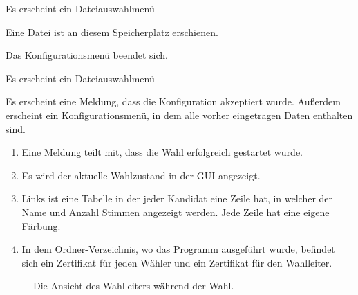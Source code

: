 \documentclass[parskip=full]{scrartcl}
\begin{document}
		{Es erscheint ein Dateiauswahlmenü}

		{Eine Datei ist an diesem Speicherplatz erschienen.}

		{Das Konfigurationsmenü beendet sich.}

		{Es erscheint ein Dateiauswahlmenü}

		{Es erscheint eine Meldung, dass die Konfiguration akzeptiert wurde. Außerdem erscheint ein Konfigurationsmenü, in dem alle vorher eingetragen Daten enthalten sind.}

		{\begin{enumerate}
				\item Eine Meldung teilt mit, dass die Wahl erfolgreich gestartet wurde.
				\item Es wird der aktuelle Wahlzustand in der GUI angezeigt.
				\item Links ist eine Tabelle in der jeder Kandidat eine Zeile hat, in welcher der Name und Anzahl Stimmen angezeigt werden. Jede Zeile hat eine eigene Färbung.
				\item In dem Ordner-Verzeichnis, wo das Programm ausgeführt wurde, befindet sich ein Zertifikat für jeden Wähler und ein Zertifikat für den Wahlleiter.
		\end{enumerate}}
	
\begin{figure}[h!]
	\caption{\label{fig:sup_result}
		Die Ansicht des Wahlleiters während der Wahl.
	}
\end{figure}
\end{document}
